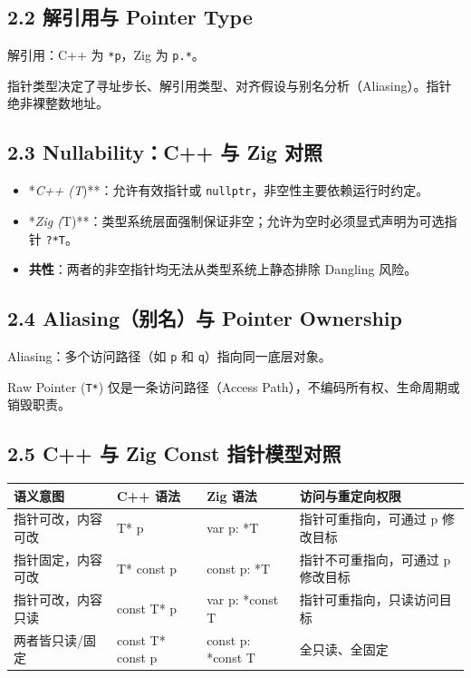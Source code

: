 \documentclass[11pt,a4paper]{article}
\begin{document}
\subsection{2.2 解引用与 Pointer Type}
解引用：C++ 为 \texttt{*p}，Zig 为 \texttt{p.*}。

指针类型决定了寻址步长、解引用类型、对齐假设与别名分析（Aliasing）。指针绝非裸整数地址。

\subsection{2.3 Nullability：C++ 与 Zig 对照}
\begin{itemize}
  \item *\textit{C++ (T})**：允许有效指针或 \texttt{nullptr}，非空性主要依赖运行时约定。
  \item *\textit{Zig (}T)**：类型系统层面强制保证非空；允许为空时必须显式声明为可选指针 \texttt{?*T}。
  \item \textbf{共性}：两者的非空指针均无法从类型系统上静态排除 Dangling 风险。
\end{itemize}
\subsection{2.4 Aliasing（别名）与 Pointer Ownership}
Aliasing：多个访问路径（如 \texttt{p} 和 \texttt{q}）指向同一底层对象。

Raw Pointer (\texttt{T*}) 仅是一条访问路径（Access Path），不编码所有权、生命周期或销毁职责。

\subsection{2.5 C++ 与 Zig Const 指针模型对照}
\begin{table}[htbp]
\centering
\small
\begin{tabularx}{\textwidth}{| X | X | X | X |}
\hline
\rowcolor{codebg}
\textbf{语义意图} & \textbf{C++ 语法} & \textbf{Zig 语法} & \textbf{访问与重定向权限} \\ \hline
指针可改，内容可改 & T* p & var p: *T & 指针可重指向，可通过 p 修改目标 \\ \hline
\rowcolor{codebg!50} 指针固定，内容可改 & T* const p & const p: *T & 指针不可重指向，可通过 p 修改目标 \\ \hline
指针可改，内容只读 & const T* p & var p: *const T & 指针可重指向，只读访问目标 \\ \hline
\rowcolor{codebg!50} 两者皆只读/固定 & const T* const p & const p: *const T & 全只读、全固定 \\ \hline
\end{tabularx}
\end{table}
\end{document}

